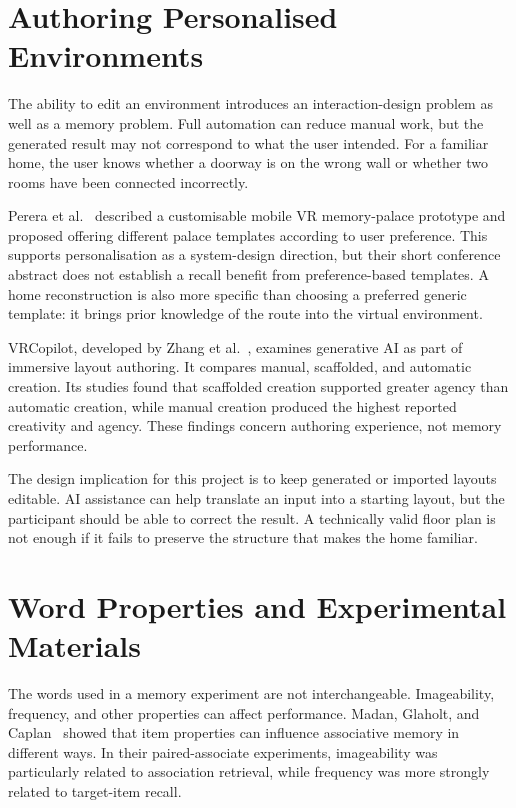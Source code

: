 \section{Authoring Personalised Environments}
The ability to edit an environment introduces an interaction-design problem as well as a memory problem. Full automation can reduce manual work, but the generated result may not correspond to what the user intended. For a familiar home, the user knows whether a doorway is on the wrong wall or whether two rooms have been connected incorrectly.

Perera et al.~\cite{perera2019} described a customisable mobile VR memory-palace prototype and proposed offering different palace templates according to user preference. This supports personalisation as a system-design direction, but their short conference abstract does not establish a recall benefit from preference-based templates. A home reconstruction is also more specific than choosing a preferred generic template: it brings prior knowledge of the route into the virtual environment.

VRCopilot, developed by Zhang et al.~\cite{zhang2024}, examines generative AI as part of immersive layout authoring. It compares manual, scaffolded, and automatic creation. Its studies found that scaffolded creation supported greater agency than automatic creation, while manual creation produced the highest reported creativity and agency. These findings concern authoring experience, not memory performance.

The design implication for this project is to keep generated or imported layouts editable. AI assistance can help translate an input into a starting layout, but the participant should be able to correct the result. A technically valid floor plan is not enough if it fails to preserve the structure that makes the home familiar.

\section{Word Properties and Experimental Materials}
The words used in a memory experiment are not interchangeable. Imageability, frequency, and other properties can affect performance. Madan, Glaholt, and Caplan~\cite{madan2010} showed that item properties can influence associative memory in different ways. In their paired-associate experiments, imageability was particularly related to association retrieval, while frequency was more strongly related to target-item recall.

